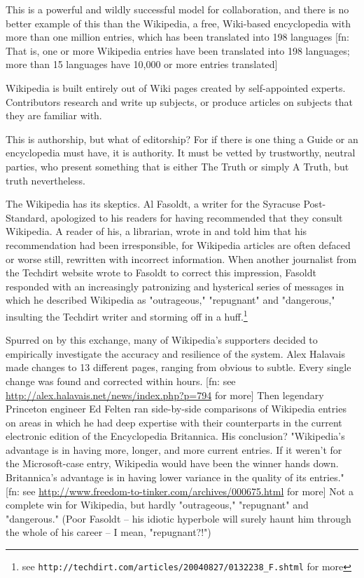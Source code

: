 This is a powerful and wildly successful model for collaboration,
and there is no better example of this than the Wikipedia, a free,
Wiki-based encyclopedia with more than one million entries, which
has been translated into 198 languages [fn: That is, one or more
Wikipedia entries have been translated into 198 languages; more
than 15 languages have 10,000 or more entries translated]

Wikipedia is built entirely out of Wiki pages created by
self-appointed experts. Contributors research and write up
subjects, or produce articles on subjects that they are familiar
with.

This is authorship, but what of editorship? For if there is one
thing a Guide or an encyclopedia must have, it is authority. It
must be vetted by trustworthy, neutral parties, who present
something that is either The Truth or simply A Truth, but truth
nevertheless.

The Wikipedia has its skeptics. Al Fasoldt, a writer for the
Syracuse Post-Standard, apologized to his readers for having
recommended that they consult Wikipedia. A reader of his, a
librarian, wrote in and told him that his recommendation had been
irresponsible, for Wikipedia articles are often defaced or worse
still, rewritten with incorrect information. When another
journalist from the Techdirt website wrote to Fasoldt to correct
this impression, Fasoldt responded with an increasingly patronizing
and hysterical series of messages in which he described Wikipedia
as "outrageous," "repugnant" and "dangerous," insulting the
Techdirt writer and storming off in a huff.\footnote{see
\texttt{http://techdirt.com/articles/20040827/0132238\_F.shtml}
for more}

Spurred on by this exchange, many of Wikipedia's supporters decided
to empirically investigate the accuracy and resilience of the
system. Alex Halavais made changes to 13 different pages, ranging
from obvious to subtle. Every single change was found and corrected
within hours. [fn: see
\href{http://alex.halavais.net/news/index.php?p=794}{http://alex.halavais.net/news/index.php?p=794}
for more] Then legendary Princeton engineer Ed Felten ran
side-by-side comparisons of Wikipedia entries on areas in which he
had deep expertise with their counterparts in the current
electronic edition of the Encyclopedia Britannica. His conclusion?
"Wikipedia's advantage is in having more, longer, and more current
entries. If it weren't for the Microsoft-case entry, Wikipedia
would have been the winner hands down. Britannica's advantage is in
having lower variance in the quality of its entries." [fn: see
\href{http://www.freedom-to-tinker.com/archives/000675.html}{http://www.freedom-to-tinker.com/archives/000675.html}
for more] Not a complete win for Wikipedia, but hardly
"outrageous," "repugnant" and "dangerous." (Poor Fasoldt -- his
idiotic hyperbole will surely haunt him through the whole of his
career -- I mean, "repugnant?!")

